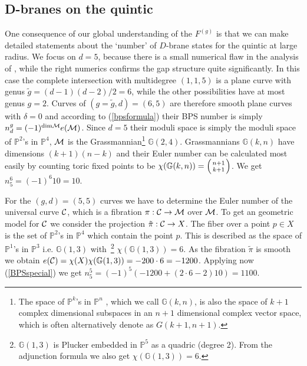 \documentclass[12pt]{article}
\def\IP{{\mathbb P}}
\begin{document}
\subsection{D-branes on the quintic}
\label{quinticdbrane}
One consequence of our global understanding of the $F^{(g)}$
is that we can make detailed statements about the `number' of
$D$-brane states for the quintic at large radius.
 We focus on $d=5$, because
there is a small numerical flaw in the analysis of
\cite{Katz:1999}, while the right numerics confirms the gap
structure quite significantly. In this case the complete
intersection with multidegree $(1,1,5)$ is a plane curve with
genus $\tilde g=(d-1)(d-2)/2=6$, while the other possibilities
have at most genus $g=2$. Curves of $(g=\tilde g,d)=(6,5)$ are
therefore smooth plane curves with $\delta=0$ and according to
(\ref{bpsformula}) their BPS number is simply $n^g_d=(-1)^{{\rm
dim} \cal M} e({\cal M})$. Since $d=5$ their moduli space is
simply the moduli space of $\mathbb{P}^2$'s in $\mathbb{P}^4$,
${\cal M}$ is the Grassmannian\footnote{The space of
$\mathbb{P}^k$'s in  $\mathbb{P}^n$ , which we call
${\mathbb{G}}(k,n)$, is also the space of $k+1$ complex
dimensional subspaces in an $n+1$ dimensional complex vector
space, which is often alternatively denote as $G(k+1,n+1)$.}
${\mathbb{G}}(2,4)$. Grassmannians ${\mathbb{G}}(k,n)$ have
dimensions $(k+1)(n-k)$ and their Euler number can be calculated
most easily by counting toric fixed points to be
$\chi({\mathbb{G}}(k,n))=\left(n+1\atop k+1\right)$.  We get
$n^6_5=(-1)^6 10=10$.

For the $(g,d)=(5,5)$ curves we have to determine the Euler number
of the universal curve ${\cal C}$, which is a fibration $\pi:{\cal
C} \rightarrow {\cal M}$ over ${\cal M}$. To get  an geometric
model for ${\cal C}$ we consider the projection $\tilde \pi:{\cal
C}\rightarrow X$. The fiber over a point $p\in X$ is the  set of
$\IP^2$'s in $\IP^4$ which contain the point $p$. This is described
as the space of $\mathbb{P}^1$'s in $\mathbb{P}^3$ i.e.
${\mathbb{G}}(1,3)$ with~\footnote{${\mathbb{G}}(1,3)$ is Plucker
embedded in $\mathbb{P}^5$ as a quadric (degree 2). From the
adjunction formula we also  get $\chi({\mathbb{G}}(1,3))=6$.}
$\chi({\mathbb{G}}(1,3))=6$. As the fibration $\tilde \pi$ is
smooth we obtain $e({\cal C})=\chi(X)
\chi({\mathbb{G}}(1,3))=-200\cdot 6=-1200$. Applying  now
(\ref{BPSspecial}) we get $n^{5}_5=(-1)^5(-1200+ (2 \cdot 6-2)
10)=1100$.
\end{document}
